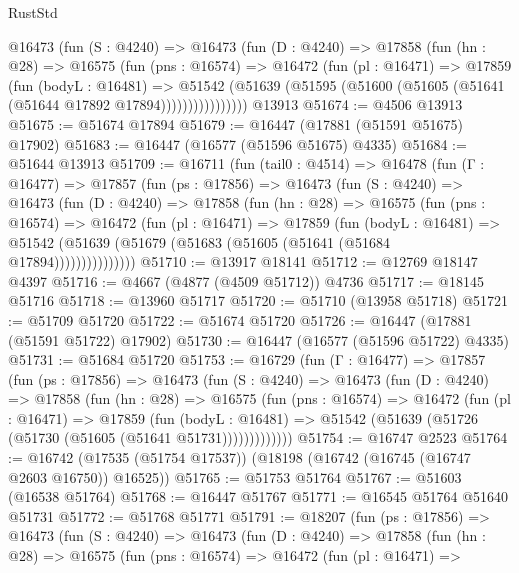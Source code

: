\begin{lexlean}{RustStd}
\begin{coremodule}
{\begin{coremodule}
{{{{{{{{{{{{{{{{{{{{{{{{{{{{{{{{{{{{{{{{{{{{{{{{{{{{{{{          @16473
            (fun (S : @4240) =>
            @16473
              (fun (D : @4240) =>
              @17858
                (fun (hn : @28) =>
                @16575
                  (fun (pns : @16574) =>
                  @16472
                    (fun (pl : @16471) =>
                    @17859
                      (fun (bodyL : @16481) =>
                      @51542
                        (@51639
                          (@51595 (@51600 (@51605 (@51641 (@51644 @17892 @17894))))))))))))))))
    @13913
@51674 := @4506 @13913
@51675 := @51674 @17894
@51679 := @16447 (@17881 (@51591 @51675) @17902)
@51683 := @16447 (@16577 (@51596 @51675) @4335)
@51684 := @51644 @13913
@51709 := @16711
    (fun (tail0 : @4514) =>
    @16478
      (fun (Γ : @16477) =>
      @17857
        (fun (ps : @17856) =>
        @16473
          (fun (S : @4240) =>
          @16473
            (fun (D : @4240) =>
            @17858
              (fun (hn : @28) =>
              @16575
                (fun (pns : @16574) =>
                @16472
                  (fun (pl : @16471) =>
                  @17859
                    (fun (bodyL : @16481) =>
                    @51542 (@51639 (@51679 (@51683 (@51605 (@51641 (@51684 @17894)))))))))))))))
@51710 := @13917 @18141
@51712 := @12769 @18147 @4397
@51716 := @4667 (@4877 (@4509 @51712)) @4736
@51717 := @18145 @51716
@51718 := @13960 @51717
@51720 := @51710 (@13958 @51718)
@51721 := @51709 @51720
@51722 := @51674 @51720
@51726 := @16447 (@17881 (@51591 @51722) @17902)
@51730 := @16447 (@16577 (@51596 @51722) @4335)
@51731 := @51684 @51720
@51753 := @16729
    (fun (Γ : @16477) =>
    @17857
      (fun (ps : @17856) =>
      @16473
        (fun (S : @4240) =>
        @16473
          (fun (D : @4240) =>
          @17858
            (fun (hn : @28) =>
            @16575
              (fun (pns : @16574) =>
              @16472
                (fun (pl : @16471) =>
                @17859
                  (fun (bodyL : @16481) =>
                  @51542 (@51639 (@51726 (@51730 (@51605 (@51641 @51731)))))))))))))
@51754 := @16747 @2523
@51764 := @16742 (@17535 (@51754 @17537)) (@18198 (@16742 (@16745 (@16747 @2603 @16750)) @16525))
@51765 := @51753 @51764
@51767 := @51603 (@16538 @51764)
@51768 := @16447 @51767
@51771 := @16545 @51764 @51640 @51731
@51772 := @51768 @51771
@51791 := @18207
    (fun (ps : @17856) =>
    @16473
      (fun (S : @4240) =>
      @16473
        (fun (D : @4240) =>
        @17858
          (fun (hn : @28) =>
          @16575
            (fun (pns : @16574) =>
            @16472
              (fun (pl : @16471) =>
}}}}}}}}}}}}}}}}}}}}}}}}}}}}}}}}}}}}}}}}}}}}}}}}}}}}}}}
\end{coremodule}}
\end{coremodule}
\end{lexlean}
